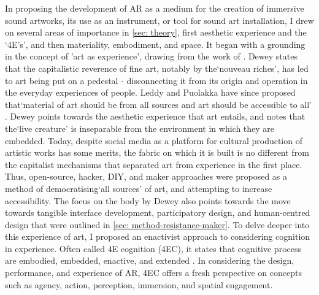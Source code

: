 In proposing the development of AR as a medium for the creation of immersive sound artworks, its use as an instrument, or tool for sound art installation, I drew on several areas of importance in \autoref{sec: theory}, first aesthetic experience and the `4E's', and then materiality, embodiment, and space. It began with a grounding in the concept of 'art as experience', drawing from the work of \citep{dewey1934}. Dewey states that the capitalistic reverence of fine art, notably by the`nouveau riches', has led to art being put on a pedestal - disconnecting it from its origin and operation in the everyday experiences of people. Leddy and Puolakka have since proposed that`material of art should be from all sources and art should be accessible to all' \citeyearpar{leddy2021}. Dewey points towards the aesthetic experience that art entails, and notes that the`live creature' is inseparable from the environment in which they are embedded. Today, despite social media as a platform for cultural production of artistic works has some merits, the fabric on which it is built is no different from the capitalist mechanisms that separated art from experience in the first place. Thus, open-source, hacker, DIY, and maker approaches were proposed as a method of democratising`all sources' of art, and attempting to increase accessibility. The focus on the body by Dewey also points towards the move towards tangible interface development, participatory design, and human-centred design that were outlined in \autoref{sec: method-resistance-maker}. To delve deeper into this experience of art, I proposed an enactivist approach to considering cognition in experience. Often called 4E cognition (4EC), it states that cognitive process are embodied, embedded, enactive, and extended \citep{gallagher2017}. In considering the design, performance, and experience of AR, 4EC offers a fresh perspective on concepts such as agency, action, perception, immersion, and spatial engagement.

